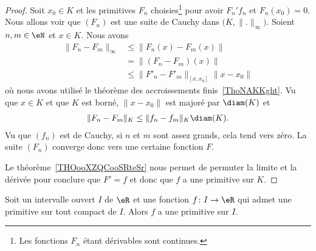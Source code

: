 \begin{proof}
    Soit \( x_0\in K\) et les primitives \( F_n\) choisies\footnote{Les fonctions \( F_n\) étant dérivables sont continues.} pour avoir \( F_n'f_n\) et \( F_n(x_0)=0\). Nous allons voir que \( (F_n)\) est une suite de Cauchy dans \( \big( K,\| . \|_{\infty} \big)\). Soient \( n,m\in \eN\) et \( x\in K\). Nous avons
    \begin{subequations}
        \begin{align}
            \| F_n-F_m \|_{\infty}&\leq \| F_n(x)-F_m(x) \|\\
            &=\| (F_n-F_m)(x) \|\\
            &\leq \| F'_n-F'_m \|_{[x,x_0]}\| x-x_0 \|
        \end{align}
    \end{subequations}
    où nous avons utilisé le théorème des accroissements finis~\ref{ThoNAKKght}. Vu que \( x\in K\) et que \( K\) est borné, \( \| x-x_0 \|\) est majoré par \( \diam(K)\) et
    \begin{subequations}
        \begin{align}
            \| F_n-F_m \|_K\leq \| f_n-f_m \|_K\diam(K).
        \end{align}
    \end{subequations}
    Vu que \( (f_n) \) est de Cauchy, si \( n\) et \( m\) sont assez grands, cela tend vers zéro. La suite \( (F_n)\) converge donc vers une certaine fonction \( F\).

    Le théorème~\ref{THOooXZQCooSRteSr} nous permet de permuter la limite et la dérivée pour conclure que \( F'=f\) et donc que \( f\) a une primitive sur \( K\).
\end{proof}

\begin{proposition}        \label{PropKKGAooDQYGKg}
    Soit un intervalle ouvert \( I\) de \( \eR\) et une fonction \( f\colon I\to \eR\) qui admet une primitive sur tout compact de \( I\). Alors \( f\) a une primitive sur \( I\).
\end{proposition}


